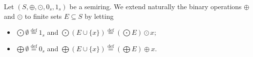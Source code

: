 \begin{notation} 
    \label{def:bigodot}
Let $(S, \oplus, \odot, 0_s, 1_s)$ be a semiring. We extend naturally the binary operations $\oplus$ and $\odot$ to finite sets $E \subseteq S$ by letting
    \begin{itemize}
        \item $\bigodot \emptyset \overset{\operatorname{def}}{=} 1_s$ and $\bigodot \left( E \cup \{x\} \right) \overset{\operatorname{def}}{=} \left( \bigodot E \right) \odot x$;
        \item $\bigoplus \emptyset \overset{\operatorname{def}}{=} 0_s$ and $\bigoplus \left( E \cup \{x\} \right) \overset{\operatorname{def}}{=} \left( \bigoplus E \right) \oplus x$.
    \end{itemize}
\end{notation}


